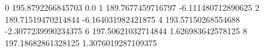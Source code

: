 0 195.8792266845703 0.0
1 189.7677459716797 -6.111480712890625
2 189.71519470214844 -6.164031982421875
4 193.57150268554688 -2.3077239990234375
6 197.50621032714844 1.626983642578125
8 197.18682861328125 1.3076019287109375

